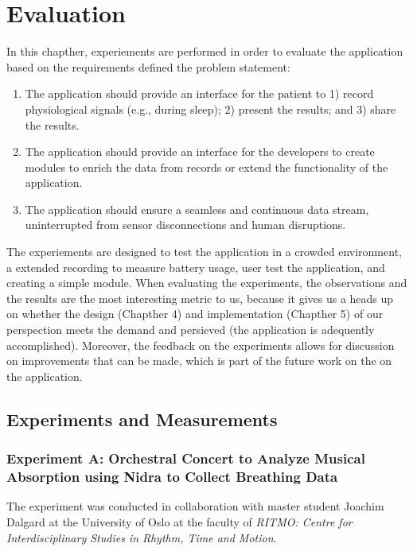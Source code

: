 \chapter{Evaluation}

In this chapther, experiements are performed in order to evaluate the application based on the requirements defined the problem statement: 

\begin{enumerate}
    \item The application should provide an interface for the patient to 1) record physiological signals (e.g., during sleep); 2) present the results; and 3) share the results.
    \item The application should provide an interface for the developers to create modules to enrich the data from records or extend the functionality of the application. 
    \item The application should ensure a seamless and continuous data stream, uninterrupted from sensor disconnections and human disruptions.
\end{enumerate}

The experiements are designed to test the application in a crowded environment, a extended recording to measure battery usage, user test the application, and creating a simple module. When evaluating the experiments, the observations and the results are the most interesting metric to us, because it gives us a heads up on whether the design (Chapther 4) and implementation (Chapther 5) of our perspection meets the demand and persieved (the application is adequently accomplished). Moreover, the feedback on the experiments allows for discussion on improvements that can be made, which is part of the future work on the on the application.



\section{Experiments and Measurements}
\subsection{Experiment A: Orchestral Concert to Analyze Musical Absorption using Nidra to Collect Breathing Data}
The experiment was conducted in collaboration with master student Joachim Dalgard at the University of Oslo at the faculty of \textit{RITMO: Centre for Interdisciplinary Studies in Rhythm, Time and Motion}. 

